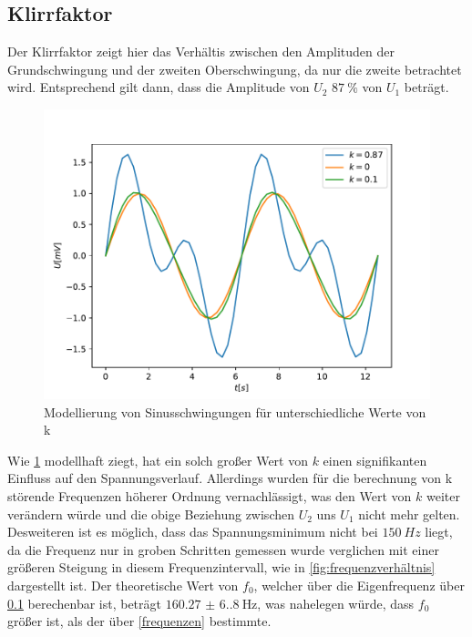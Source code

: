 \subsection{Klirrfaktor}
Der Klirrfaktor zeigt hier das Verhältis zwischen den Amplituden der Grundschwingung und der zweiten Oberschwingung,
da nur die zweite betrachtet wird.
Entsprechend gilt dann, dass die Amplitude von $U_2$ $\qty{87}{\percent}$ von $U_1$ beträgt.

\begin{figure}
    \centering
    \includegraphics{./Klirr_Model.pdf}
    \caption{Modellierung von Sinusschwingungen für unterschiedliche Werte von k}
    \label{fig:klirr_mod}
\end{figure}

Wie \ref{fig:klirr_mod} modellhaft ziegt, hat ein solch großer Wert von $k$ einen signifikanten Einfluss auf den Spannungsverlauf.
Allerdings wurden für die berechnung von k störende Frequenzen höherer Ordnung vernachlässigt, was den Wert von $k$ weiter
verändern würde und die obige Beziehung zwischen $U_2$ uns $U_1$ nicht mehr gelten. Desweiteren ist es möglich, dass 
das Spannungsminimum nicht bei $\qty{150}{Hz}$ liegt, da die Frequenz nur in groben Schritten gemessen wurde verglichen mit einer
größeren Steigung in diesem Frequenzintervall, wie in \ref{fig:frequenzverhältnis} dargestellt ist. Der theoretische Wert von
$f_0$, welcher über die Eigenfrequenz über \ref{} berechenbar ist, beträgt $\qty{160.27(6.80)}{\hertz}$, was nahelegen würde,
dass $f_0$ größer ist, als der über \ref{frequenzen} bestimmte.